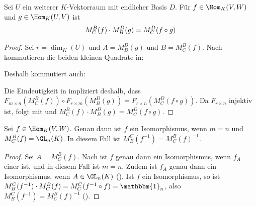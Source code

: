 \begin{lemma}
	Sei $U$ ein weiterer $K$-Vektorraum mit endlicher Basis $D$. Für $f\in \Hom_K(V,W)$ und $g\in \Hom_K(U,V)$ ist 
	\begin{align}
		M_C^B(f)\cdot M_B^D(g)=M_C^D(f\circ g)\notag
	\end{align}
\end{lemma}
\begin{proof}
	Sei $r=\dim_K(U)$ und $A=M_B^D(g)$ und $B=M_C^B(f)$. Nach  kommutieren die beiden kleinen Quadrate in: 
	\begin{center}\end{center}
	Deshalb kommutiert auch:
	\begin{center}\end{center}
	Die Eindeutigkeit in  impliziert deshalb, dass $F_{m\times n}(M_C^B(f))\circ F_{r\times m}(M_B^D(g))=F_{r\times n}
	(M_C^D(f\circ g))$. Da $F_{r\times n}$ injektiv ist, folgt mit  und  $M_C^B(f)\cdot M_B^D(g)=M_C^D(f\circ g)$.
\end{proof}

\begin{conclusion}
	Sei $f\in \Hom_K(V,W)$. Genau dann ist $f$ ein Isomorphismus, wenn $m=n$ und $M_C^B(f)=\GL_{n}(K)$. In 
	diesem Fall ist $M_B^C(f^{-1})=M_C^B(f)^{-1}$.
\end{conclusion}
\begin{proof}
	Sei $A=M_C^B(f)$. Nach  ist $f$ genau dann ein Isomorphismus, wenn $f_A$ einer ist, und in diesem Fall ist $m=n$. Zudem ist 
	$f_A$ genau dann ein Isomorphismus, wenn $A\in \GL_{n}(K)$ (). Ist $f$ ein Isomorphismus, so ist $M_B^C(f^{-1})\cdot 
	M_C^B(f)=M_C^C(f^{-1}\circ f)=\mathbbm{1}_n$, also $M_B^C(f^{-1})=M_C^B(f)^{-1}$ ().
\end{proof}

